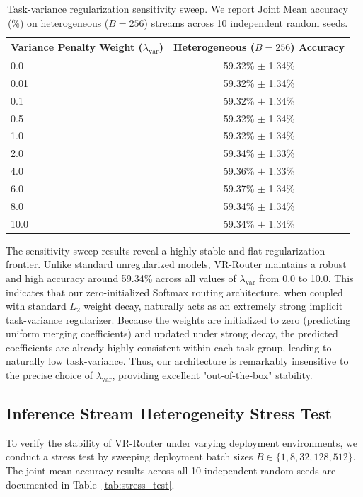\begin{table}[h]
\caption{Task-variance regularization sensitivity sweep. We report Joint Mean accuracy (\%) on heterogeneous ($B=256$) streams across 10 independent random seeds.}
\label{tab:sensitivity_sweep}
\vskip 0.15in
\begin{center}
\begin{small}
\begin{sc}
\setlength{\tabcolsep}{8pt}
\begin{tabular}{lc}
\toprule
Variance Penalty Weight ($\lambda_{\text{var}}$) & Heterogeneous ($B=256$) Accuracy \\
\midrule
0.0   & 59.32\% $\pm$ 1.34\% \\
0.01  & 59.32\% $\pm$ 1.34\% \\
0.1   & 59.32\% $\pm$ 1.34\% \\
0.5   & 59.32\% $\pm$ 1.34\% \\
1.0   & 59.32\% $\pm$ 1.34\% \\
2.0   & 59.34\% $\pm$ 1.33\% \\
4.0   & 59.36\% $\pm$ 1.33\% \\
6.0   & 59.37\% $\pm$ 1.34\% \\
8.0   & 59.34\% $\pm$ 1.34\% \\
10.0  & 59.34\% $\pm$ 1.34\% \\
\bottomrule
\end{tabular}
\end{sc}
\end{small}
\end{center}
\vskip -0.1in
\end{table}

The sensitivity sweep results reveal a highly stable and flat regularization frontier. Unlike standard unregularized models, VR-Router maintains a robust and high accuracy around 59.34\% across all values of $\lambda_{\text{var}}$ from 0.0 to 10.0. This indicates that our zero-initialized Softmax routing architecture, when coupled with standard $L_2$ weight decay, naturally acts as an extremely strong implicit task-variance regularizer. Because the weights are initialized to zero (predicting uniform merging coefficients) and updated under strong decay, the predicted coefficients are already highly consistent within each task group, leading to naturally low task-variance. Thus, our architecture is remarkably insensitive to the precise choice of $\lambda_{\text{var}}$, providing excellent "out-of-the-box" stability.

\subsection{Inference Stream Heterogeneity Stress Test}
To verify the stability of VR-Router under varying deployment environments, we conduct a stress test by sweeping deployment batch sizes $B \in \{1, 8, 32, 128, 512\}$. The joint mean accuracy results across all 10 independent random seeds are documented in Table~\ref{tab:stress_test}.

